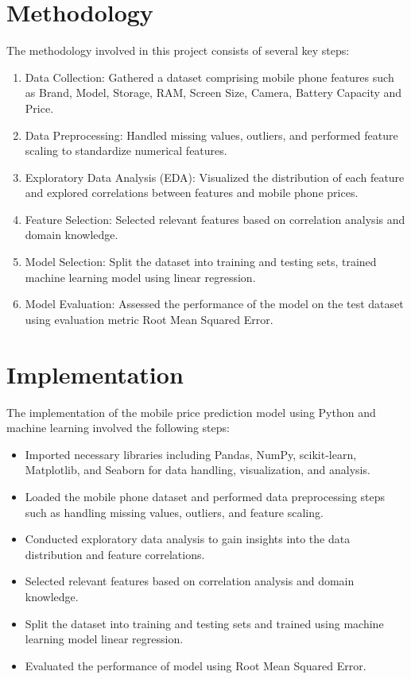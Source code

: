 \documentclass{article}
\begin{document}
\section{Methodology}
The methodology involved in this project consists of several key steps:
\begin{enumerate}
    \item Data Collection: Gathered a dataset comprising mobile phone features such as Brand, Model, Storage, RAM, Screen Size, Camera, Battery Capacity and Price.
    \item Data Preprocessing: Handled missing values, outliers, and performed feature scaling to standardize numerical features.
    \item Exploratory Data Analysis (EDA): Visualized the distribution of each feature and explored correlations between features and mobile phone prices.
    \item Feature Selection: Selected relevant features based on correlation analysis and domain knowledge.
    \item Model Selection: Split the dataset into training and testing sets, trained machine learning model using linear regression.
    \item Model Evaluation: Assessed the performance of the model on the test dataset using evaluation metric Root Mean Squared Error.
\end{enumerate}

\section{Implementation}
The implementation of the mobile price prediction model using Python and machine learning involved the following steps:
\begin{itemize}
    \item Imported necessary libraries including Pandas, NumPy, scikit-learn, Matplotlib, and Seaborn for data handling, visualization, and analysis.
    \item Loaded the mobile phone dataset and performed data preprocessing steps such as handling missing values, outliers, and feature scaling.
    \item Conducted exploratory data analysis to gain insights into the data distribution and feature correlations.
    \item Selected relevant features based on correlation analysis and domain knowledge.
    \item Split the dataset into training and testing sets and trained using machine learning model linear regression.
    \item Evaluated the performance of model using Root Mean Squared Error.
\end{itemize}
\end{document}

